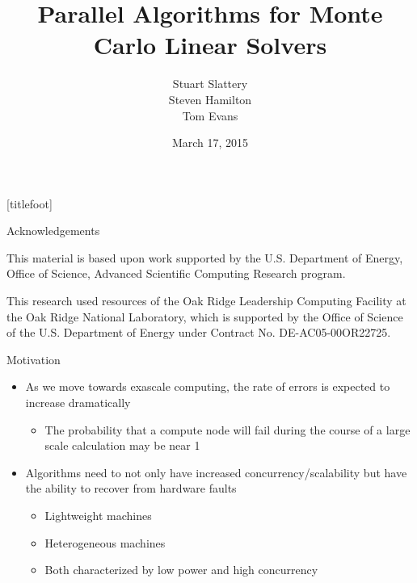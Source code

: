 \documentclass{beamer}
\title[Parallel Monte Carlo Solvers]{Parallel Algorithms for Monte Carlo
  Linear Solvers}
\author[Slattery, Hamilton, Evans]{Stuart Slattery
  \\ Steven Hamilton \\ Tom Evans}
\date[3/17/15]{March 17, 2015}
\institute[ORNL]{\small Oak Ridge National Laboratory}
\begin{document}

{
[titlefoot]
\begin{frame}
\titlepage
\end{frame}
}

\begin{frame}{Acknowledgements}

  This material is based upon work supported by the U.S. Department of
  Energy, Office of Science, Advanced Scientific Computing Research
  program.

  \vfill

  This research used resources of the Oak Ridge Leadership Computing
  Facility at the Oak Ridge National Laboratory, which is supported by the
  Office of Science of the U.S. Department of Energy under Contract No.
  DE-AC05-00OR22725.

\end{frame}

\begin{frame}{Motivation}
  \vfill
\begin{itemize}
  \item As we move towards exascale computing, the rate of errors is expected
  to increase dramatically
  \vfill
  \begin{itemize}
  \item The probability that a compute node will fail during the course
    of a large scale calculation may be near 1
  \end{itemize}
  \vfill
\item Algorithms need to not only have increased concurrency/scalability
  but have the ability to recover from hardware faults
  \begin{itemize}
  \item Lightweight machines
  \item Heterogeneous machines
  \item Both characterized by low power and high concurrency
  \end{itemize}
  \vfill
\end{itemize}
\vfill
\end{frame}
\end{document}
